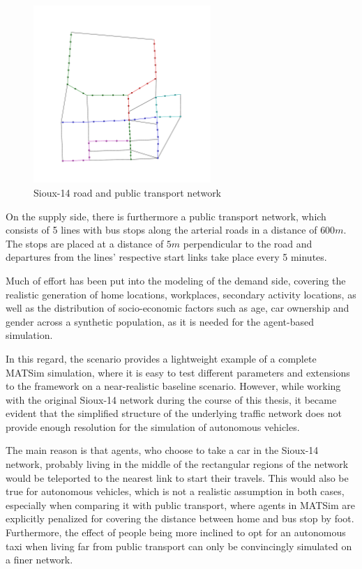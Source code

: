 \begin{figure}
    \centering
    \includegraphics[width=0.6\textwidth]{figures/sioux14_pt.pdf}
    \caption{Sioux-14 road and public transport network}
    \label{fig:sioux14}
\end{figure}

On the supply side, there is furthermore a public transport network, which
consists of 5 lines with bus stops along the arterial roads in a distance of $600m$.
The stops are placed at a distance of $5m$ perpendicular to the road and departures
from the lines' respective start links take place every 5 minutes.

Much of effort has been put into the modeling of the demand side, covering the
realistic generation of home locations, workplaces, secondary activity locations,
as well as the distribution of socio-economic factors such as age, car ownership
and gender across a synthetic population, as it is needed for the agent-based
simulation.

In this regard, the scenario provides a lightweight example of a complete MATSim
simulation, where it is easy to test different parameters and extensions to the
framework on a near-realistic baseline scenario. However, while working with the
original Sioux-14 network during the course of this thesis, it became evident that
the simplified structure of the underlying traffic network does not provide enough
resolution for the simulation of autonomous vehicles.

The main reason is that agents, who choose to take a car in the Sioux-14 network,
probably living in the middle of the rectangular regions of the network would be
teleported to the nearest link to start their travels. This would also be true
for autonomous vehicles, which is not a realistic assumption in both cases, especially
when comparing it with public transport, where agents in MATSim are explicitly
penalized for covering the distance between home and bus stop by foot.
Furthermore, the effect of people being more inclined to opt for an autonomous taxi
when living far from public transport can only be convincingly simulated on a
finer network.

